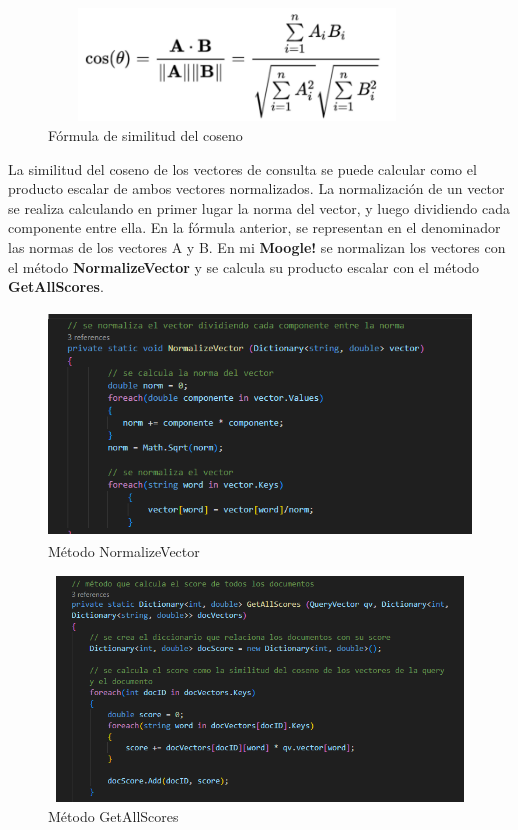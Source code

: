 \documentclass[12pt, letterpaper]{article}
\begin{document}
        \begin{figure}[h]
                \centering
                \caption{Fórmula de similitud del coseno}
                \includegraphics[width=10cm,height=3cm]{./img/simcos.png}
        \end{figure}    
       
        \newpage
        La similitud del coseno de los vectores de consulta se puede calcular como el producto escalar de ambos vectores normalizados. La normalización de un vector se realiza calculando en primer lugar la norma del vector, y luego dividiendo cada componente entre ella. En la fórmula anterior, se representan en el denominador las normas de los vectores A y B. En mi \textbf{Moogle!} se normalizan los vectores con el método \textbf{NormalizeVector} y se calcula su producto escalar con el método \textbf{GetAllScores}.
        
        \begin{figure}[h]
            \centering
            \caption{Método NormalizeVector}
            \includegraphics[width=12cm,height=6cm]{./img/normvec.png}
        \end{figure}
        
        \begin{figure}[h]
            \centering
            \caption{Método GetAllScores}
            \includegraphics[width=12cm,height=6cm]{./img/getscore.png}
        \end{figure}
       
\end{document}
